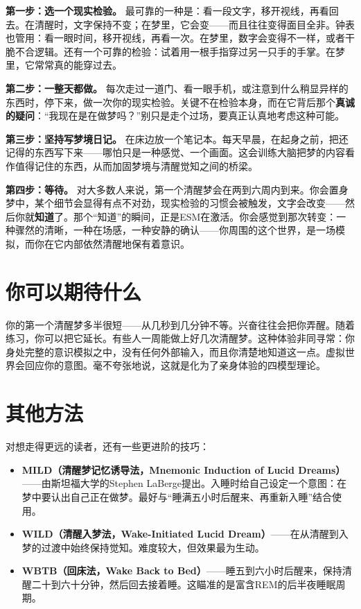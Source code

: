 \documentclass[11pt, twoside, openright]{book}
\begin{document}
\textbf{第一步：选一个现实检验。} 最可靠的一种是：看一段文字，移开视线，再看回去。在清醒时，文字保持不变；在梦里，它会变------而且往往变得面目全非。钟表也管用：看一眼时间，移开视线，再看一次。在梦里，数字会变得不一样，或者干脆不合逻辑。还有一个可靠的检验：试着用一根手指穿过另一只手的手掌。在梦里，它常常真的能穿过去。

\textbf{第二步：一整天都做。} 每次走过一道门、看一眼手机，或注意到什么稍显异样的东西时，停下来，做一次你的现实检验。关键不在检验本身，而在它背后那个\textbf{真诚的疑问}：“我现在是在做梦吗？”别只是走个过场，要真正认真地考虑这种可能。

\textbf{第三步：坚持写梦境日记。} 在床边放一个笔记本。每天早晨，在起身之前，把还记得的东西写下来------哪怕只是一种感觉、一个画面。这会训练大脑把梦的内容看作值得记住的东西，从而加固梦境与清醒觉知之间的桥梁。

\textbf{第四步：等待。} 对大多数人来说，第一个清醒梦会在两到六周内到来。你会置身梦中，某个细节会显得有点不对劲，现实检验的习惯会被触发，文字会改变------然后你就\textbf{知道}了。那个“知道”的瞬间，正是ESM在激活。你会感觉到那次转变：一种骤然的清晰，一种在场感，一种安静的确认------你周围的这个世界，是一场模拟，而你在它内部依然清醒地保有着意识。

\section*{你可以期待什么}

你的第一个清醒梦多半很短------从几秒到几分钟不等。兴奋往往会把你弄醒。随着练习，你可以把它延长。有些人一周能做上好几次清醒梦。这种体验非同寻常：你身处完整的意识模拟之中，没有任何外部输入，而且你清楚地知道这一点。虚拟世界会回应你的意图。毫不夸张地说，这就是化为了亲身体验的四模型理论。

\section*{其他方法}

对想走得更远的读者，还有一些更进阶的技巧：

\begin{itemize}
  \item \textbf{MILD（清醒梦记忆诱导法，Mnemonic Induction of Lucid Dreams）}------由斯坦福大学的Stephen LaBerge提出。入睡时给自己设定一个意图：在梦中要认出自己正在做梦。最好与“睡满五小时后醒来、再重新入睡”结合使用。
  \item \textbf{WILD（清醒入梦法，Wake-Initiated Lucid Dream）}------在从清醒到入梦的过渡中始终保持觉知。难度较大，但效果最为生动。
  \item \textbf{WBTB（回床法，Wake Back to Bed）}------睡五到六小时后醒来，保持清醒二十到六十分钟，然后回去接着睡。这瞄准的是富含REM的后半夜睡眠周期。
\end{itemize}
\end{document}
